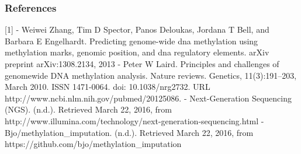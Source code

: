 \documentclass{article} %
\begin{document}

\subsubsection*{References}
[1] - Weiwei Zhang, Tim D Spector, Panos Deloukas, Jordana T Bell, and Barbara E Engelhardt. Predicting genome-wide dna methylation using methylation marks, genomic position, and dna regulatory elements. arXiv preprint arXiv:1308.2134, 2013
\newline
\newline
[2] - Peter W Laird. Principles and challenges of genomewide DNA methylation analysis. Nature reviews. Genetics, 11(3):191–203, March 2010. ISSN 1471-0064. doi: 10.1038/nrg2732. URL http://www.ncbi.nlm.nih.gov/pubmed/20125086.
\newline
\newline
[3] - Next-Generation Sequencing (NGS). (n.d.). Retrieved March 22, 2016, from http://www.illumina.com/technology/next-generation-sequencing.html
\newline
\newline
[4] - Bjo/methylation\_imputation. (n.d.). Retrieved March 22, 2016, from https://github.com/bjo/methylation\_imputation
\end{document}
